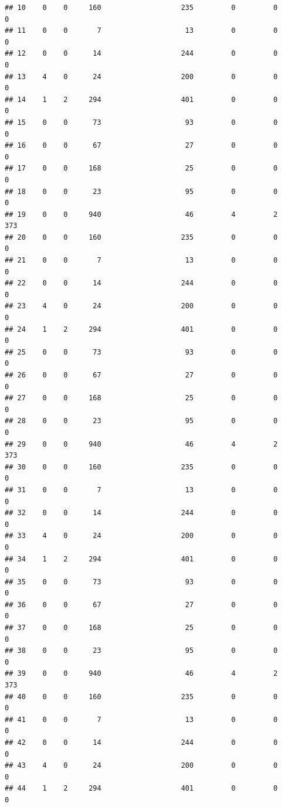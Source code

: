 \documentclass[
]{article}
\begin{document}
\begin{verbatim}
## 10    0    0     160                   235         0         0        0
## 11    0    0       7                    13         0         0        0
## 12    0    0      14                   244         0         0        0
## 13    4    0      24                   200         0         0        0
## 14    1    2     294                   401         0         0        0
## 15    0    0      73                    93         0         0        0
## 16    0    0      67                    27         0         0        0
## 17    0    0     168                    25         0         0        0
## 18    0    0      23                    95         0         0        0
## 19    0    0     940                    46         4         2      373
## 20    0    0     160                   235         0         0        0
## 21    0    0       7                    13         0         0        0
## 22    0    0      14                   244         0         0        0
## 23    4    0      24                   200         0         0        0
## 24    1    2     294                   401         0         0        0
## 25    0    0      73                    93         0         0        0
## 26    0    0      67                    27         0         0        0
## 27    0    0     168                    25         0         0        0
## 28    0    0      23                    95         0         0        0
## 29    0    0     940                    46         4         2      373
## 30    0    0     160                   235         0         0        0
## 31    0    0       7                    13         0         0        0
## 32    0    0      14                   244         0         0        0
## 33    4    0      24                   200         0         0        0
## 34    1    2     294                   401         0         0        0
## 35    0    0      73                    93         0         0        0
## 36    0    0      67                    27         0         0        0
## 37    0    0     168                    25         0         0        0
## 38    0    0      23                    95         0         0        0
## 39    0    0     940                    46         4         2      373
## 40    0    0     160                   235         0         0        0
## 41    0    0       7                    13         0         0        0
## 42    0    0      14                   244         0         0        0
## 43    4    0      24                   200         0         0        0
## 44    1    2     294                   401         0         0        0

\end{verbatim}
\end{document}
